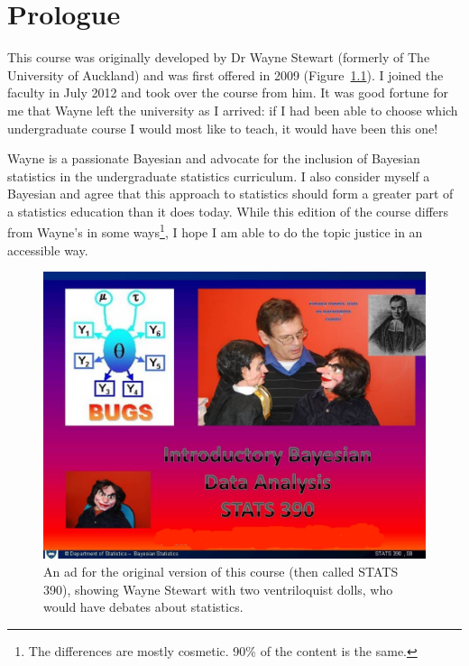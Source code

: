 \chapter{Prologue}
This course was originally developed by Dr Wayne Stewart (formerly of The
University of
Auckland) and was first offered in 2009 (Figure~\ref{fig:wayne}).
I joined the faculty in July 2012
and took over the course from him. It was good fortune for me that Wayne left
the university as I arrived: if I had been able to choose which undergraduate
course I would most like to teach, it would have been this one!

Wayne is a passionate Bayesian and advocate
for the inclusion of Bayesian statistics in the undergraduate
statistics curriculum. I also consider myself a Bayesian and agree that this
approach to statistics should form a greater part of a statistics education
than it does today. 
While this edition of the course differs from Wayne's in some ways\footnote{
The differences are mostly cosmetic. 90\% of the content is the same.},
I hope I am able to do the topic justice in an accessible way.

\begin{figure}
\begin{center}
\includegraphics[scale=0.5]{Figures/390course.jpg}
\end{center}
\caption{An ad for the original version of this course (then called
STATS 390), showing Wayne Stewart with two ventriloquist dolls, who would
have debates about statistics.\label{fig:wayne}}
\end{figure}

